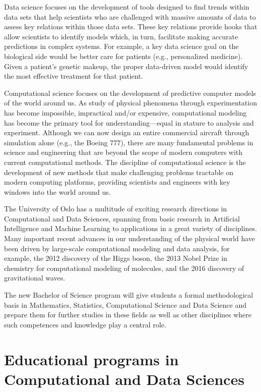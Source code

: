 \documentclass[oneside,final,10pt]{article}
\begin{document}
Data science focuses on the development of tools designed to find trends within data sets that help scientists who are challenged with massive amounts of data to assess key relations within those data sets. These key relations provide hooks that allow scientists to identify models which, in turn, facilitate making accurate predictions in complex systems. For example, a key data science goal on the biological side would be better care for patients (e.g., personalized medicine). Given a patient’s genetic makeup, the proper data-driven model would identify the most effective treatment for that patient. 

Computational science focuses on the development of predictive computer models of the world around us. As study of physical phenomena through experimentation has become impossible, impractical and/or expensive, computational modeling has become the primary tool for understanding—equal in stature to analysis and experiment. Although we can now design an entire commercial aircraft through simulation alone (e.g., the Boeing 777), there are many fundamental problems in science and engineering that are beyond the scope of modern computers with current computational methods. The discipline of computational science is the development of new methods that make challenging problems tractable on modern computing platforms, providing scientists and engineers with key windows into the world around us.

The University of Oslo has a multitude of exciting research directions in Computational and Data Sciences, spanning from basic research in Artificial Intelligence and Machine Learning to applications in a great variety of disciplines. Many important recent advances in our understanding of the physical world have been driven by large-scale computational modeling and data analysis, for example, the 2012 discovery of the Higgs boson, the 2013 Nobel Prize in chemistry for computational modeling of molecules, and the 2016 discovery of gravitational waves.

The new Bachelor of Science program will give students a formal methodological basis in Mathematics, Statistics, Computational Science and Data Science and prepare them for further studies in these fields as well as other disciplines where such competences and knowledge play a central role. 



\section*{Educational programs in Computational and Data Sciences}
\end{document}
